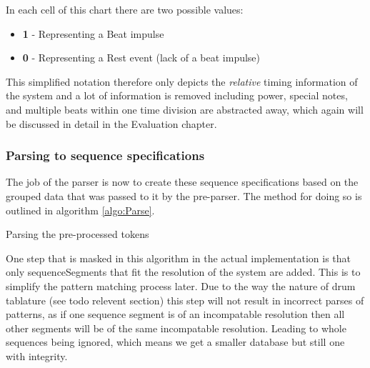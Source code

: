 \documentclass[12pt,twoside,notitlepage]{report}
\begin{document}
				In each cell of this chart there are two possible values:
					\begin{itemize}
						\item{\textbf{1} - Representing a Beat impulse}
						\item{\textbf{0} - Representing a Rest event (lack of a beat impulse)}
					\end{itemize}
					
				This simplified notation therefore only depicts the \emph{relative} timing information of the system and a lot of information is removed including power, special notes, and multiple beats within one time division are abstracted away, which again will be discussed in detail in the Evaluation chapter.
				
				\subsubsection{Parsing to sequence specifications}
				
				The job of the parser is now to create these sequence specifications based on the grouped data that was passed to it by the pre-parser. The method for doing so is outlined in algorithm \ref{algo:Parse}.
				
				\begin{algorithm}
				\caption{Parsing the pre-processed tokens}
				\label{algo:Parse}
				\begin{algorithmic}[1]
								\EndFor
							\EndFor
						\EndFor
						
					

					\EndProcedure
				\end{algorithmic}
				\end{algorithm}
				
				One step that is masked in this algorithm in the actual implementation is that only sequenceSegments that fit the resolution of the system are added. This is to simplify the pattern matching process later. Due to the way the nature of drum tablature (see todo relevent section) this step will not result in incorrect parses of patterns, as if one sequence segment is of an incompatable resolution then all other segments will be of the same incompatable resolution. Leading to whole sequences being ignored, which means we get a smaller database but still one with integrity.
\end{document}
